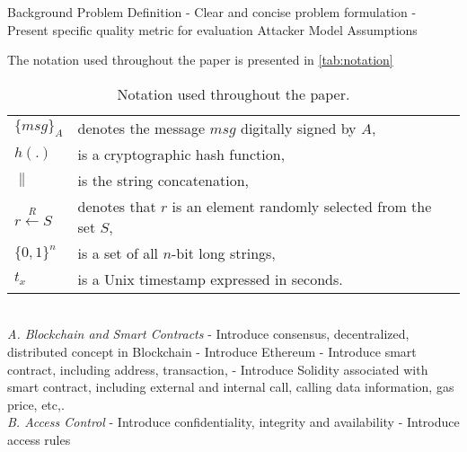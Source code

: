 Background
Problem Definition
- Clear and concise problem formulation
- Present specific quality metric for evaluation
Attacker Model
Assumptions

The notation used throughout the paper is presented in \autoref{tab:notation}
\begin{table}[h!]
\begin{center}
    \begin{tabular}{ll}
$\{msg\}_A$ & denotes the message $msg$ digitally signed by $A$, \\
$h(.)$ & is a cryptographic hash function, \\
$\|$ & is the string concatenation, \\
$r\xleftarrow{R}S$ & denotes that $r$ is an element randomly selected from the set $S$,\\
$\{0,1\}^n$ & is a set of all $n$-bit long strings,\\
$t_x$ & is a Unix timestamp expressed in seconds. \\
\end{tabular}
\end{center}
    \caption{Notation used throughout the paper.}
    \label{tab:notation}
\end{table}
\\\textit{A. Blockchain and Smart Contracts}
- Introduce consensus, decentralized, distributed concept in Blockchain
- Introduce Ethereum
- Introduce smart contract, including address, transaction, 
- Introduce Solidity associated with smart contract, including external and internal call, calling data information, gas price, etc,.
\\\textit{B. Access Control}
- Introduce confidentiality, integrity and availability
- Introduce access rules



